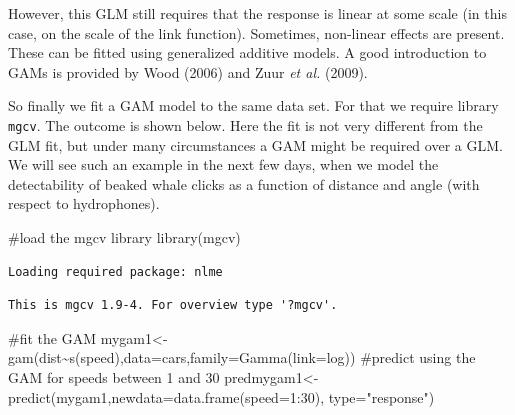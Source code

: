 \documentclass[
  letterpaper,
  DIV=11,
  numbers=noendperiod]{scrartcl}
\newenvironment{Shaded}{\begin{snugshade}}{\end{snugshade}}
\newcommand{\AttributeTok}[1]{\textcolor[rgb]{0.40,0.45,0.13}{#1}}
\newcommand{\CommentTok}[1]{\textcolor[rgb]{0.37,0.37,0.37}{#1}}
\newcommand{\DecValTok}[1]{\textcolor[rgb]{0.68,0.00,0.00}{#1}}
\newcommand{\FunctionTok}[1]{\textcolor[rgb]{0.28,0.35,0.67}{#1}}
\newcommand{\NormalTok}[1]{\textcolor[rgb]{0.00,0.23,0.31}{#1}}
\newcommand{\OtherTok}[1]{\textcolor[rgb]{0.00,0.23,0.31}{#1}}
\newcommand{\SpecialCharTok}[1]{\textcolor[rgb]{0.37,0.37,0.37}{#1}}
\newcommand{\StringTok}[1]{\textcolor[rgb]{0.13,0.47,0.30}{#1}}
\begin{document}
However, this GLM still requires that the response is linear at some
scale (in this case, on the scale of the link function). Sometimes,
non-linear effects are present. These can be fitted using generalized
additive models. A good introduction to GAMs is provided by Wood (2006)
and Zuur \emph{et al.} (2009).

So finally we fit a GAM model to the same data set. For that we require
library \texttt{mgcv}. The outcome is shown below. Here the fit is not
very different from the GLM fit, but under many circumstances a GAM
might be required over a GLM. We will see such an example in the next
few days, when we model the detectability of beaked whale clicks as a
function of distance and angle (with respect to hydrophones).

\begin{Shaded}
\begin{Highlighting}[]
\CommentTok{\#load the mgcv library}
\FunctionTok{library}\NormalTok{(mgcv)}
\end{Highlighting}
\end{Shaded}

\begin{verbatim}
Loading required package: nlme
\end{verbatim}

\begin{verbatim}
This is mgcv 1.9-4. For overview type '?mgcv'.
\end{verbatim}

\begin{Shaded}
\begin{Highlighting}[]
\CommentTok{\#fit the GAM}
\NormalTok{mygam1}\OtherTok{\textless{}{-}}\FunctionTok{gam}\NormalTok{(dist}\SpecialCharTok{\textasciitilde{}}\FunctionTok{s}\NormalTok{(speed),}\AttributeTok{data=}\NormalTok{cars,}\AttributeTok{family=}\FunctionTok{Gamma}\NormalTok{(}\AttributeTok{link=}\NormalTok{log))}
\CommentTok{\#predict using the GAM for speeds between 1 and 30}
\NormalTok{predmygam1}\OtherTok{\textless{}{-}}\FunctionTok{predict}\NormalTok{(mygam1,}\AttributeTok{newdata=}\FunctionTok{data.frame}\NormalTok{(}\AttributeTok{speed=}\DecValTok{1}\SpecialCharTok{:}\DecValTok{30}\NormalTok{),}
\AttributeTok{type=}\StringTok{"response"}\NormalTok{)}
\end{Highlighting}
\end{Shaded}
\end{document}
